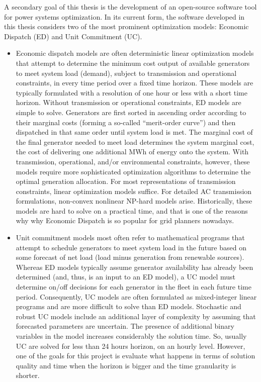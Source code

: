 \documentclass[12pt,LUDisStyle,twosided]{book}
\begin{document}
A secondary goal of this thesis is the development of an open-source software tool for power systems optimization.  In its current form, the software developed in this thesis considers two of the most prominent optimization models: Economic Dispatch (ED) and Unit Commitment (UC). 

\begin{itemize}
\item Economic dispatch models are often deterministic linear optimization models that attempt to determine the minimum cost output of available generators to meet system load (demand), subject to transmission and operational constraints, in every time period over a fixed time horizon.  These models are typically formulated with a resolution of one hour or less with a short time horizon. Without transmission or operational constraints, ED models are simple to solve. Generators are first sorted in ascending order according to their marginal costs (forming a so-called ``merit-order curve'') and then dispatched in that same order until system load is met. The marginal cost of the final generator needed to meet load determines the system marginal cost, the cost of delivering one additional MWh of energy onto the system.  With transmission, operational, and/or environmental constraints, however, these models require more sophisticated optimization algorithms to determine the optimal generation allocation.  For most representations of transmission constraints, linear optimization models suffice.  For detailed AC transmission formulations, non-convex nonlinear NP-hard models arise. Historically, these models are hard to solve on a practical time, and that is one of the reasons why why Economic Dispatch is so popular for grid planners nowadays.

\item Unit commitment models most often refer to mathematical programs that attempt to schedule generators to meet system load in the future based on some forecast of net load (load minus generation from renewable sources).  Whereas ED models typically assume generator availability has already been determined (and, thus, is an input to an ED model), a UC model must determine on/off decisions for each generator in the fleet in each future time period.  Consequently, UC models are often formulated as mixed-integer linear programs and are more difficult to solve than ED models.  Stochastic and robust UC models include an additional layer of complexity by assuming that forecasted parameters are uncertain. The presence of additional binary variables in the model increases considerably the solution time. So, usually UC are solved for less than 24 hours horizon, on an hourly level. However, one of the goals for this project is evaluate what happens in terms of solution quality and time when the horizon is bigger and the time granularity is shorter.

\end{itemize}
\end{document}
